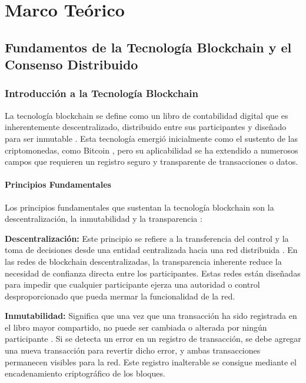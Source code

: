 \documentclass[spanish,12pt,letterpaper]{report}
\begin{document}
\chapter{Marco Teórico}

\section{Fundamentos de la Tecnología Blockchain y el Consenso Distribuido}

\subsection{Introducción a la Tecnología Blockchain}

La tecnología blockchain se define como un libro de contabilidad digital que es inherentemente descentralizado, distribuido entre sus participantes y diseñado para ser inmutable \parencite{aws2025blockchain}. Esta tecnología emergió inicialmente como el sustento de las criptomonedas, como Bitcoin \parencite{nakamoto2008bitcoin}, pero su aplicabilidad se ha extendido a numerosos campos que requieren un registro seguro y transparente de transacciones o datos.

\subsubsection{Principios Fundamentales}

Los principios fundamentales que sustentan la tecnología blockchain son la descentralización, la inmutabilidad y la transparencia \parencite{amores2020blockchain}:

\textbf{Descentralización:} Este principio se refiere a la transferencia del control y la toma de decisiones desde una entidad centralizada hacia una red distribuida \parencite{aws2025blockchain}. En las redes de blockchain descentralizadas, la transparencia inherente reduce la necesidad de confianza directa entre los participantes. Estas redes están diseñadas para impedir que cualquier participante ejerza una autoridad o control desproporcionado que pueda mermar la funcionalidad de la red.

\textbf{Inmutabilidad:} Significa que una vez que una transacción ha sido registrada en el libro mayor compartido, no puede ser cambiada o alterada por ningún participante \parencite{aws2025blockchain}. Si se detecta un error en un registro de transacción, se debe agregar una nueva transacción para revertir dicho error, y ambas transacciones permanecen visibles para la red. Este registro inalterable se consigue mediante el encadenamiento criptográfico de los bloques.
\end{document}
